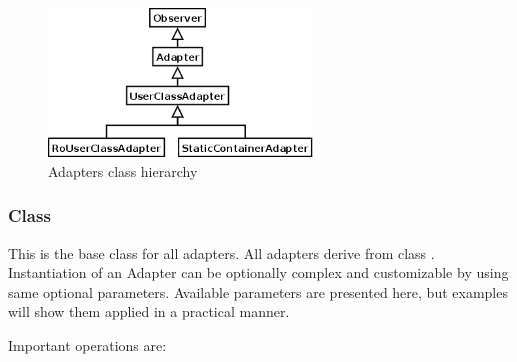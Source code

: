 \begin{figure}[here]
\begin{center}
\includegraphics[width=7cm]{figs/png/adapuml}
\caption{\label{ADAPuml_f} Adapters class hierarchy}
\end{center}
\end{figure}



\subsubsection{Class }
This is the base class for all adapters. All adapters derive from
class . Instantiation of an Adapter can be
optionally complex and customizable by using same optional
parameters. Available parameters are presented here, but examples
will show them applied in a practical manner. 

Important operations are:

